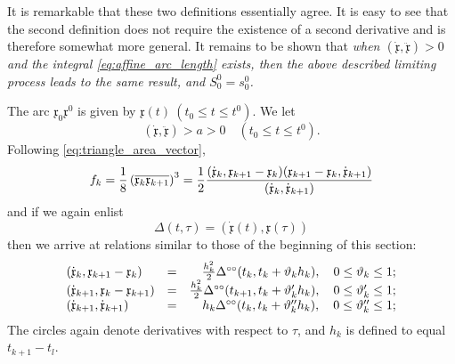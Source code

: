 \documentclass[11pt]{book} \usepackage{amssymb}
\newcommand{\myvec}[1]{\mathfrak{#1}}
\newcommand{\vecx}{\myvec{x}}
\newcommand{\vecderiv}[1]{\dot{\myvec{#1}}}
\newcommand{\vecderivv}[1]{\ddot{\myvec{#1}}}
\begin{document}
It is remarkable that these two definitions essentially agree. It is easy to
see that the second definition does not require the existence of a second
derivative and is therefore somewhat more general. It remains to be shown that
{\em when $(\vecderiv{x},\vecderivv{x})>0$ and the integral 
  \eqref{eq:affine_arc_length} exists, then the above described limiting 
  process leads to the same result, and $S_0^0=s_0^0$.}

The arc $\vecx_0\vecx^0$ is given by $\vecx(t)\:(t_0\leq t \leq t^0)$. We let
\begin{equation}
  \label{eq:bound_curvature}
  (\vecderiv{x},\vecderivv{x})>a>0 \quad (t_0\leq t \leq t^0).
\end{equation}
Following \eqref{eq:triangle_area_vector},
\begin{equation}
  \label{eq:kth_segment_len}
  f_k={1\over 8}\left(\overline{\vecx_k\vecx_{k+1}}\right)^3
  = {1 \over 2}
  { (\vecderiv{x}_k,\vecx_{k+1}-\vecx_k)
    (\vecx_{k+1}-\vecx_k,\vecderiv{x}_{k+1})
    \over
    (\vecderiv{x}_k,\vecderiv{x}_{k+1})
  }
\end{equation}
and if we again enlist
\begin{equation}
  \label{eq:delta}
  \Delta(t,\tau)=(\vecderiv{x}(t),\vecx(\tau))
\end{equation}
then we arrive at relations similar to those of the beginning of this section:
\begin{equation}
  \label{eq:delta_relations}
  \begin{array}{lcr}
    (\vecderiv{x}_k,\vecx_{k+1}-\vecx_k)&=&{h_k^2\over 2}\Delta^{\circ\circ}(t_k,t_k+\vartheta_kh_k),\quad 0\leq \vartheta_k\leq 1;\\
    (\vecderiv{x}_{k+1},\vecx_k-\vecx_{k+1})&=&{h_k^2\over 2}\Delta^{\circ\circ}(t_{k+1},t_k+\vartheta'_kh_k),\quad 0\leq \vartheta'_k\leq 1;\\
    (\vecderiv{x}_{k+1},\vecderiv{x}_{k+1})&=&h_k\Delta^{\circ\circ}(t_k,t_k+\vartheta''_kh_k),\quad 0\leq \vartheta''_k\leq 1;
  \end{array}
\end{equation}
The circles again denote derivatives with respect to $\tau$, and $h_k$ is
defined to equal $t_{k+1}-t_l$.
\end{document}
